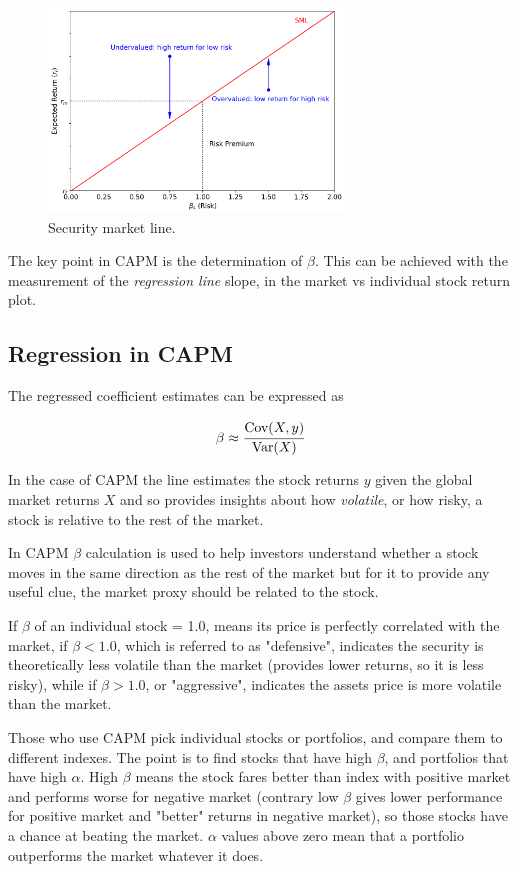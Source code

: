 \begin{figure}[htb]
	\centering
	\includegraphics[width=0.7\textwidth]{figures/sml}
	\caption{Security market line.}
	\label{fig:sml}
\end{figure}

The key point in CAPM is the determination of $\beta$. This can be achieved with the measurement of the \emph{regression line} slope, in the market vs individual stock return plot.

\subsection{Regression in CAPM}

The regressed coefficient estimates can be expressed as 

\begin{equation}
\beta \approx \cfrac{\text{Cov}(X,y)}{\text{Var}(X)}
\end{equation}

In the case of CAPM the line estimates the stock returns $y$ given the global market returns $X$ and so provides insights about how \emph{volatile}, or how risky, a stock is relative to the rest of the market.

In CAPM $\beta$ calculation is used to help investors understand whether a stock moves in the same direction as the rest of the market but for it to provide any useful clue, the market proxy should be related to the stock.

If $\beta$ of an individual stock = 1.0, means its price is perfectly correlated with the market, if $\beta < 1.0$, which is referred to as "defensive", indicates the security is theoretically less volatile than the market (provides lower returns, so it is less risky), while if $\beta > 1.0$, or "aggressive", indicates the assets price is more volatile than the market.

Those who use CAPM pick individual stocks or portfolios, and compare them to different indexes. The point is to find stocks that have high $\beta$, and portfolios that have high $\alpha$. High $\beta$ means the stock fares better than index with positive market and performs worse for negative market (contrary low $\beta$ gives lower performance for positive market and "better" returns in negative market), so those stocks have a chance at beating the market. $\alpha$ values above zero mean that a portfolio outperforms the market whatever it does.

